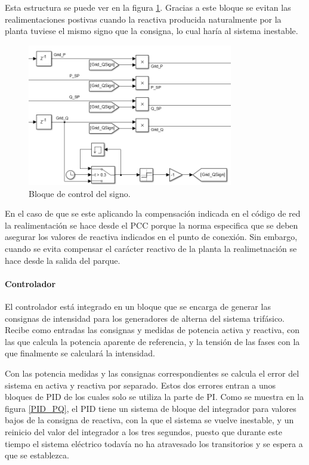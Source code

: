 \documentclass{book}
\begin{document}
Esta estructura se puede ver en la figura \ref{ControlSign}. Gracias a este bloque se evitan las realimentaciones postivas cuando la reactiva producida naturalmente por la planta tuviese el mismo signo que la consigna, lo cual har\'ia al sistema inestable.  \par

\begin{figure}[h!]
\centering
\includegraphics[width=0.8\textwidth]{ControlSign.PNG}
\caption{Bloque de control del signo. }
\label{ControlSign}
\end{figure} \par

En el caso de que se este aplicando la compensaci\'on indicada en el c\'odigo de red la realimentaci\'on se hace desde el PCC porque la norma especifica que se deben asegurar los valores de reactiva indicados en el punto de conexi\'on. Sin embargo, cuando se evita compensar el car\'acter reactivo de la planta la realimetnaci\'on se hace desde la salida del parque. \par

\paragraph{Controlador}

El controlador est\'a integrado en un bloque que se encarga de generar las consignas de intensidad para los generadores de alterna del sistema trif\'asico. Recibe como entradas las consignas y medidas de potencia activa y reactiva, con las que calcula la potencia aparente de referencia, y la tensi\'on de las fases con la que finalmente se calcular\'a la intensidad. \par

Con las potencia medidas y las consignas correspondientes se calcula el error del sistema en activa y reactiva por separado. Estos dos errores entran a unos bloques de PID de los cuales solo se utiliza la parte de PI. Como se muestra en la figura \ref{PID_PQ}, el PID tiene un sistema de bloque del integrador para valores bajos de la consigna de reactiva, con la que el sistema se vuelve inestable, y un reinicio del valor del integrador a los tres segundos, puesto que durante este tiempo el sistema el\'ectrico todav\'ia no ha atravesado los transitorios y se espera a que se establezca. \par
\end{document}
